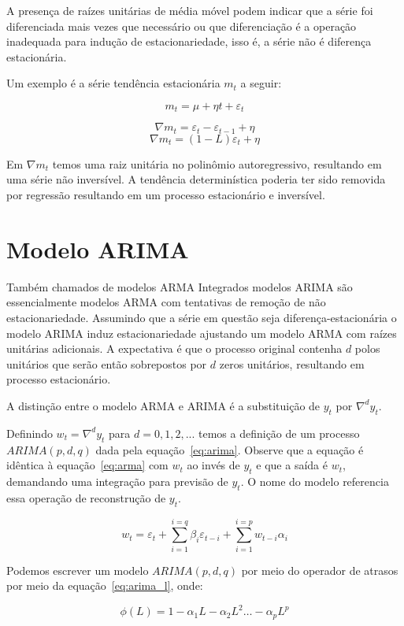 A presença de raízes unitárias de média móvel podem indicar que a série foi
diferenciada mais vezes que necessário ou que diferenciação é a operação
inadequada para indução de estacionariedade, isso é, a série não é diferença
estacionária.

Um exemplo é a série tendência estacionária $m_t$ a seguir:

$$ m_t = \mu + \eta t + \varepsilon_t $$

$$ \nabla m_t = \varepsilon_t - \varepsilon_{t-1} + \eta $$
$$ \nabla m_t = (1 - L)\varepsilon_t + \eta $$

Em $\nabla m_t$ temos uma raiz unitária no polinômio autoregressivo, resultando
em uma série não inversível. A tendência determinística poderia ter sido
removida por regressão resultando em um processo estacionário e inversível.


\section{Modelo ARIMA}
\label{sec:ARIMA}

Também chamados de modelos ARMA Integrados modelos ARIMA são essencialmente
modelos ARMA com tentativas de remoção de não estacionariedade. Assumindo que a
série em questão seja diferença-estacionária  o modelo ARIMA induz
estacionariedade ajustando um modelo ARMA com raízes unitárias adicionais. A
expectativa é que o processo original contenha $d$ polos unitários que serão
então sobrepostos por $d$ zeros unitários, resultando em processo estacionário.

A distinção entre o modelo ARMA e ARIMA é a substituição de $y_t$ por $\nabla^d
y_t$.

Definindo $w_t = \nabla^d y_t$ para $d = 0, 1, 2, ...$ temos a definição de um
processo $ARIMA(p, d, q)$ dada pela equação~\ref{eq:arima}. Observe que a
equação é idêntica à equação~\ref{eq:arma} com $w_t$ ao invés de $y_t$ e que a
saída é $w_t$, demandando uma integração para previsão de $y_t$. O nome do
modelo referencia essa operação de reconstrução de $y_t$.

\begin{equation}\label{eq:arima}
    w_t = \varepsilon_t  + \sum_{i=1}^{i=q} \beta_i \varepsilon_{t-i} + \sum_{i=1}^{i=p} w_{t-i}\alpha_i
\end{equation}

Podemos escrever um modelo $ARIMA(p, d, q)$ por meio do operador de atrasos
por meio da equação~\ref{eq:arima_l}, onde:

$$\phi(L) = 1 - \alpha_1 L - \alpha_2 L^2 \hdots - \alpha_p L^p$$

